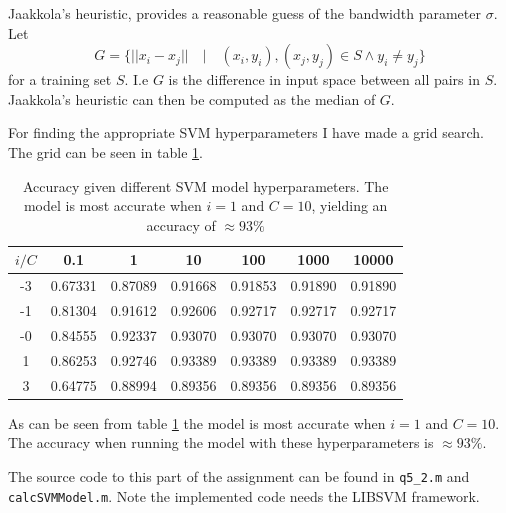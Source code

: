 \documentclass[10pt]{article}
\begin{document}
Jaakkola's heuristic, provides a reasonable guess of the bandwidth parameter $\sigma$\cite{assignment3}. Let 
\begin{equation}
  G = \{ ||x_i - x_j||\quad | \quad (x_i,y_i),(x_j,y_j) \in S \wedge y_i \neq y_j \}
\end{equation}
for a training set $S$. I.e $G$ is the difference in input space between all pairs in $S$. Jaakkola's heuristic can then be computed as the median of $G$. 

For finding the appropriate SVM hyperparameters I have made a grid search. The grid can be seen in table \ref{table4}.  

\begin{table}
  \begin{center}  
    \begin{tabular}{ | c | c | c | c | c | c | c |}
      \hline
       $i/C$   & 0.1          & 1             & 10           & 100           & 1000          &     10000\\ \hline
       -3 & 0.67331           & 0.87089       & 0.91668      & 0.91853       & 0.91890       &     0.91890\\ \hline
       -1 & 0.81304           & 0.91612       & 0.92606      & 0.92717       & 0.92717       &     0.92717\\ \hline            
       -0 & 0.84555           & 0.92337       & 0.93070      & 0.93070       & 0.93070       &     0.93070\\ \hline      
       1  & 0.86253           & 0.92746       & 0.93389      & 0.93389       & 0.93389       &     0.93389\\ \hline      
       3  & 0.64775           & 0.88994       & 0.89356      & 0.89356       & 0.89356       &     0.89356\\ \hline      
    \end{tabular}
    \caption{Accuracy given different SVM model hyperparameters. The model is most accurate when $i=1$ and $C=10$, yielding an accuracy of $\approx 93\%$}
    \label{table4}
  \end{center}    
\end{table}   
As can be seen from table \ref{table4} the model is most accurate when $i=1$ and $C=10$. The accuracy when running the model with these hyperparameters is $\approx 93\%$.

The source code to this part of the assignment can be found in \texttt{q5\_2.m} and \texttt{calcSVMModel.m}. Note the implemented code needs the LIBSVM framework\cite{libsvm}. 
\end{document}
